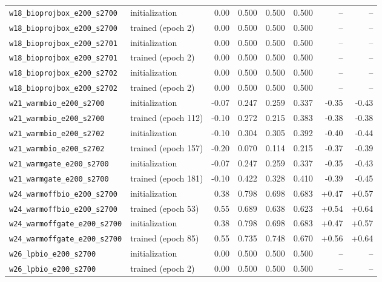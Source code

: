 \begin{table}[H]
\begin{tabular}{@{}llrrrrrr@{}}
    \texttt{w18\_bioprojbox\_e200\_s2700} & initialization & 0.00 & 0.500 & 0.500 & 0.500 & -- & -- \\
    \texttt{w18\_bioprojbox\_e200\_s2700} & trained (epoch 2) & 0.00 & 0.500 & 0.500 & 0.500 & -- & -- \\
    \texttt{w18\_bioprojbox\_e200\_s2701} & initialization & 0.00 & 0.500 & 0.500 & 0.500 & -- & -- \\
    \texttt{w18\_bioprojbox\_e200\_s2701} & trained (epoch 2) & 0.00 & 0.500 & 0.500 & 0.500 & -- & -- \\
    \texttt{w18\_bioprojbox\_e200\_s2702} & initialization & 0.00 & 0.500 & 0.500 & 0.500 & -- & -- \\
    \texttt{w18\_bioprojbox\_e200\_s2702} & trained (epoch 2) & 0.00 & 0.500 & 0.500 & 0.500 & -- & -- \\
    \texttt{w21\_warmbio\_e200\_s2700} & initialization & -0.07 & 0.247 & 0.259 & 0.337 & -0.35 & -0.43 \\
    \texttt{w21\_warmbio\_e200\_s2700} & trained (epoch 112) & -0.10 & 0.272 & 0.215 & 0.383 & -0.38 & -0.38 \\
    \texttt{w21\_warmbio\_e200\_s2702} & initialization & -0.10 & 0.304 & 0.305 & 0.392 & -0.40 & -0.44 \\
    \texttt{w21\_warmbio\_e200\_s2702} & trained (epoch 157) & -0.20 & 0.070 & 0.114 & 0.215 & -0.37 & -0.39 \\
    \texttt{w21\_warmgate\_e200\_s2700} & initialization & -0.07 & 0.247 & 0.259 & 0.337 & -0.35 & -0.43 \\
    \texttt{w21\_warmgate\_e200\_s2700} & trained (epoch 181) & -0.10 & 0.422 & 0.328 & 0.410 & -0.39 & -0.45 \\
    \texttt{w24\_warmoffbio\_e200\_s2700} & initialization & 0.38 & 0.798 & 0.698 & 0.683 & +0.47 & +0.57 \\
    \texttt{w24\_warmoffbio\_e200\_s2700} & trained (epoch 53) & 0.55 & 0.689 & 0.638 & 0.623 & +0.54 & +0.64 \\
    \texttt{w24\_warmoffgate\_e200\_s2700} & initialization & 0.38 & 0.798 & 0.698 & 0.683 & +0.47 & +0.57 \\
    \texttt{w24\_warmoffgate\_e200\_s2700} & trained (epoch 85) & 0.55 & 0.735 & 0.748 & 0.670 & +0.56 & +0.64 \\
    \texttt{w26\_lpbio\_e200\_s2700} & initialization & 0.00 & 0.500 & 0.500 & 0.500 & -- & -- \\
    \texttt{w26\_lpbio\_e200\_s2700} & trained (epoch 2) & 0.00 & 0.500 & 0.500 & 0.500 & -- & -- \\

\end{tabular}
\end{table}
